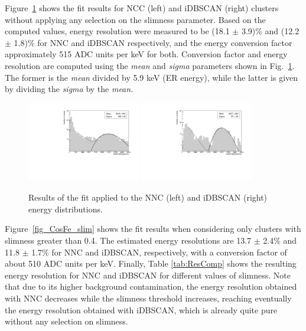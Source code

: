 \documentclass[a4paper,11pt]{article}
\begin{document}
Figure~\ref{fig_CosFe} shows the fit results for NCC (left) and iDBSCAN (right) clusters without applying any selection on the slimness parameter.
Based on the computed values, energy resolution were measured to be (18.1 $\pm$ 3.9)\% and (12.2 $\pm$ 1.8)\% for NNC and iDBSCAN respectively, and the energy conversion factor approximately 515 ADC units per keV for both.
Conversion factor and energy resolution are computed using the \textit{mean} and \textit{sigma} parameters shown in Fig.~\ref{fig_CosFe}. 
The former is the \textit{mean} divided by 5.9 keV (ER energy), while the latter is given by dividing the \textit{sigma} by the \textit{mean}.
%

\begin{figure}[ht]
\centering
\includegraphics[width=0.44\textwidth]{log_Resolution_NNC_0.pdf}
\includegraphics[width=0.44\textwidth]{log_Resolution_DB_0.pdf}
\caption{Results of the fit applied to the NNC (left) and iDBSCAN (right) energy distributions.}
\label{fig_CosFe}
\end{figure}


%



Figure~\ref{fig_CosFe_slim} shows the fit results when considering only clusters with slimness greater than 0.4.
The estimated energy resolutions are 13.7 $\pm$ 2.4\% and 11.8 $\pm$ 1.7\% for NNC and iDBSCAN, respectively, with a conversion factor of about 510 ADC units per keV.
Finally, Table \ref{tab:ResComp} shows the resulting energy resolution for NNC and iDBSCAN for different values of slimness. Note that due to its higher background contamination, the energy resolution obtained with NNC decreases while the slimness threshold increases, reaching eventually the energy resolution obtained with iDBSCAN, which is already quite pure without any selection on slimness.
\end{document}
